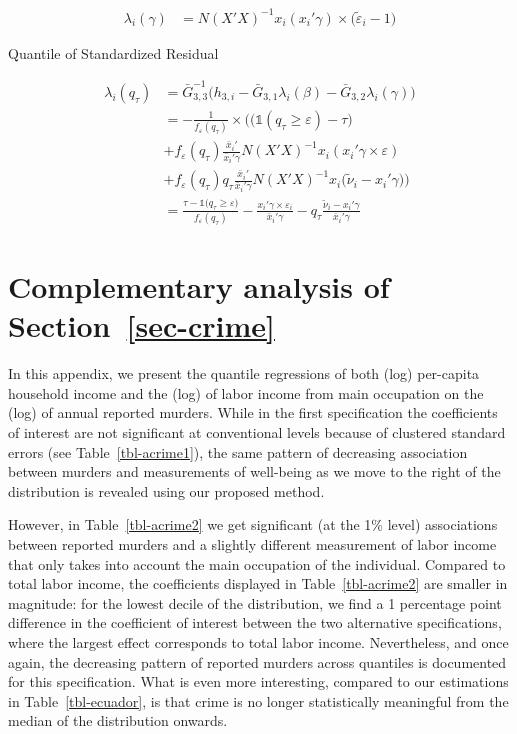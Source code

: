 \documentclass[
  12pt,
  oneside]{article}
\begin{document}
\[\begin{aligned}
\lambda_i(\gamma) &= N(X'X)^{-1} x_i ( x_i' \gamma ) \times (\tilde \varepsilon_i -1\big)
\end{aligned}
\]

Quantile of Standardized Residual

\[\begin{aligned}
\lambda_i(q_\tau)&=\bar G_{3,3}^{-1}
\Big(
 h_{3,i}-\bar G_{3,1} \lambda_i(\beta)-\bar G_{3,2} \lambda_i(\gamma)
\Big) \\
&=-\frac{1}{f_{\varepsilon}(q_\tau)} \times \Bigg( \Big(\mathbb{1} ( q_\tau  \geq \varepsilon  ) - \tau \Big)  \\
&+ f_{\varepsilon} (q_\tau) \frac{\bar x_i'}{\bar x_i'\gamma} 
N (X'X)^{-1} x_i  ( x_i'\gamma \times \varepsilon) \\
&+ f_{\varepsilon}(q_\tau) q_\tau \frac{\bar x_i'}{\bar x_i'\gamma} N(X'X)^{-1} x_i   \big( \tilde \nu_i -x_i' 
  \gamma \big) 
\Bigg) \\
&=\frac{\tau-\mathbb{1}\big( q_\tau  \geq \varepsilon  \big) }{f_{\varepsilon}(q_\tau)}
- \frac{ x_i'\gamma \times \varepsilon_i }{\bar x_i'\gamma} 
-  q_\tau \frac{ \tilde \nu_i -x_i' 
  \gamma }{\bar x_i'\gamma} 
\end{aligned}
\]

\section{\texorpdfstring{Complementary analysis of
Section~\ref{sec-crime}}{Complementary analysis of Section~}}\label{sec-app-crime}

In this appendix, we present the quantile regressions of both (log)
per-capita household income and the (log) of labor income from main
occupation on the (log) of annual reported murders. While in the first
specification the coefficients of interest are not significant at
conventional levels because of clustered standard errors (see
Table~\ref{tbl-acrime1}), the same pattern of decreasing association
between murders and measurements of well-being as we move to the right
of the distribution is revealed using our proposed method.

However, in Table~\ref{tbl-acrime2} we get significant (at the 1\%
level) associations between reported murders and a slightly different
measurement of labor income that only takes into account the main
occupation of the individual. Compared to total labor income, the
coefficients displayed in Table~\ref{tbl-acrime2} are smaller in
magnitude: for the lowest decile of the distribution, we find a 1
percentage point difference in the coefficient of interest between the
two alternative specifications, where the largest effect corresponds to
total labor income. Nevertheless, and once again, the decreasing pattern
of reported murders across quantiles is documented for this
specification. What is even more interesting, compared to our
estimations in Table~\ref{tbl-ecuador}, is that crime is no longer
statistically meaningful from the median of the distribution onwards.
\end{document}
